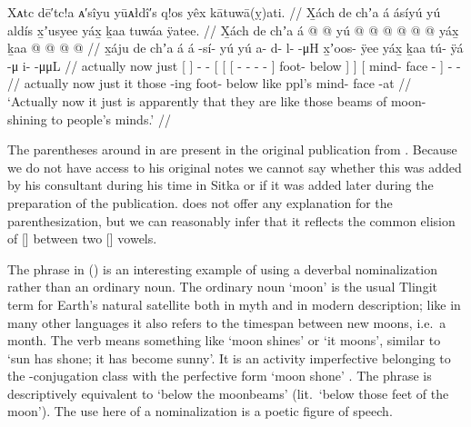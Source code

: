 \ex\label{ex:89-80-like-moonbeams}%
%
\begingl
	\glpreamble	Xᴀtc dē′tc!a ᴀ′sîyu yūᴀłdî′s q!os yêx kātuwā(ỵ)ati. //
	\glpreamble	X̱ách de chʼa á ásíyú yú aldís x̱ʼusyee yáx̱ ḵaa tuwáa ÿatee. //
	\gla	X̱ách de chʼa {} á {}  @ {} @ {}
		{} {} yú {}  @ {} @ {} @ {} @ {} @ {} {}
			 @ {} {} yáx̱ {}
		{} ḵaa  @ {} @ {} {}
		 @ {} @ {} //
	\glb	x̱áju de chʼa {} á {} á -sí- yú
		{} {} yú {} a- d- l-  -μH {} {}
			x̱ʼoos- ÿee {} yáx̱ {}
		{} ḵaa tú- ÿá -μ {}
		i-  -μμL //
	\glc	actually now just {}[  {}]  - -
		{}[ {}[  {}[ - - -  - \· {}]
			foot- below {}]  {}]
		{}[  mind- face - {}]
		-  - //
	\gld	actually now just {} it {}  {} {}
		{} {} those {}  {} {} {} {} -ing {}
			foot- below {} like {}
		{} ppl’s mind- face -at {}
		 {} {} //
	\glft	‘Actually now it just is apparently that they are like those beams of moon-shining to people’s minds.’
		//
\endgl
\xe

The parentheses around  in  are present in the original publication from \citeauthor{swanton:1909}.
Because we do not have access to his original notes we cannot say whether this was added by his consultant during his time in Sitka or if it was added later during the preparation of the publication.
\citeauthor{swanton:1909} does not offer any explanation for the parenthesization, but we can reasonably infer that it reflects the common elision of  [] between two  [] vowels.

The phrase  in (\lastx) is an interesting example of using a deverbal nominalization rather than an ordinary noun.
The ordinary noun  ‘moon’ is the usual Tlingit term for Earth’s natural satellite both in myth and in modern description; like in many other languages it also refers to the timespan between new moons, i.e.\ a month.
The verb  means something like ‘moon shines’ or ‘it moons’, similar to  ‘sun has shone; it has become sunny’.
It is an activity imperfective belonging to the -conjugation class with the perfective form  ‘moon shone’ \parencite[335]{leer:1976}.
The phrase  is descriptively equivalent to  ‘below the moonbeams’ (lit.\ ‘below those feet of the moon’).
The use here of a nominalization is a poetic figure of speech.

